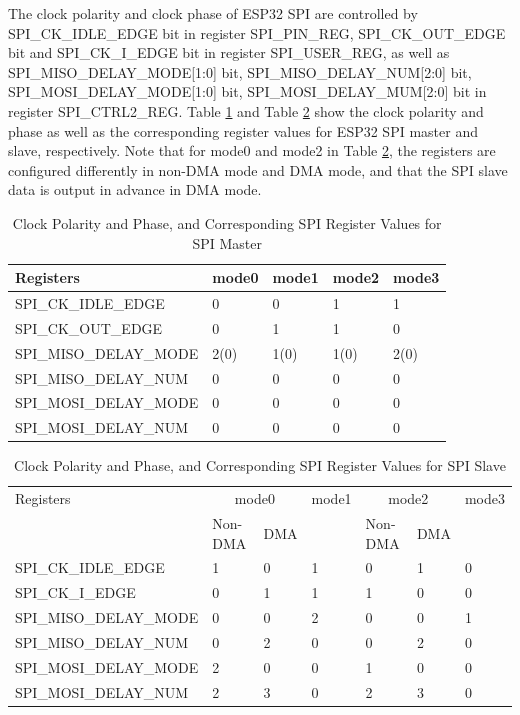 \documentclass[main\_\_EN.tex]{subfiles}
\begin{document}
The clock polarity and clock phase of ESP32 SPI are controlled by SPI\_CK\_IDLE\_EDGE bit in register SPI\_PIN\_REG, SPI\_CK\_OUT\_EDGE bit and SPI\_CK\_I\_EDGE bit in register SPI\_USER\_REG, as well as SPI\_MISO\_DELAY\_MODE[1:0] bit, SPI\_MISO\_DELAY\_NUM[2:0] bit, SPI\_MOSI\_DELAY\_MODE[1:0] bit, SPI\_MOSI\_DELAY\_MUM[2:0] bit in register SPI\_CTRL2\_REG. Table \ref{table:clockpol_master} and Table \ref{table:clockpol_slave} show the clock polarity and phase as well as the corresponding register values for ESP32 SPI master and slave, respectively. Note that for mode0 and mode2 in Table \ref{table:clockpol_slave}, the registers are configured differently in non-DMA mode and DMA mode, and that the SPI slave data is output in advance in DMA mode.

\begin{table}
    \centering
    \caption{Clock Polarity and Phase, and Corresponding SPI Register Values for SPI Master}
    \label{table:clockpol_master}
    \begin{tabular}[c]{|p{5cm}|p{2cm}|p{2cm}|p{2cm}|p{2cm}|}
    \hline
    \rowcolor{lightgray}
    Registers & mode0 & mode1 & mode2 & mode3\\
    \hline
     SPI\_CK\_IDLE\_EDGE & 0 & 0 & 1 & 1\\
    \hline
    SPI\_CK\_OUT\_EDGE  & 0 & 1 & 1 & 0\\
    \hline
    SPI\_MISO\_DELAY\_MODE & 2(0) & 1(0) & 1(0) & 2(0)\\
    \hline
    SPI\_MISO\_DELAY\_NUM & 0 & 0 & 0 & 0\\
    \hline
    SPI\_MOSI\_DELAY\_MODE & 0 & 0 & 0 & 0\\
    \hline
    SPI\_MOSI\_DELAY\_NUM & 0 & 0 & 0 & 0\\
    \hline
    \end{tabular}
\end{table}

\begin{longtable}[c]{|p{4.5cm}|p{1.7cm}|p{1.5cm}|p{1.5cm}|p{1.7cm}|p{1.5cm}|p{1.5cm}|}
\caption{Clock Polarity and Phase, and Corresponding SPI Register Values for SPI Slave}\label{table:clockpol_slave}
\\\hline
\rowcolor{lightgray}
Registers& \multicolumn{2}{c|}{mode0} & mode1 & \multicolumn{2}{c|}{mode2} & mode3\\\cline{2-3}\cline{5-6}
\rowcolor{lightgray}
&Non-DMA&DMA&&Non-DMA&DMA&\\\hline
    SPI\_CK\_IDLE\_EDGE & 1 & 0  & 1 & 0 & 1 & 0\\\hline
    SPI\_CK\_I\_EDGE  & 0 & 1  & 1 & 1 & 0  & 0\\\hline
    SPI\_MISO\_DELAY\_MODE & 0 & 0  & 2 & 0 & 0  & 1\\\hline
    SPI\_MISO\_DELAY\_NUM & 0 & 2  & 0 & 0 & 2  & 0\\\hline
    SPI\_MOSI\_DELAY\_MODE & 2 & 0  & 0 & 1 & 0  & 0\\\hline
    SPI\_MOSI\_DELAY\_NUM & 2 & 3  & 0 & 2 & 3  & 0\\\hline
\end{longtable}
\end{document}
